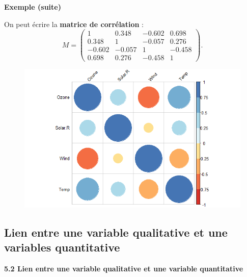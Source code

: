 \documentclass[aspectratio=169,xcolor=dvipsnames]{beamer}
\begin{document}
\begin{frame}
	\begin{exampleblock}{\textbf{Exemple (suite)}}
	\begin{footnotesize}
	On peut écrire la \textbf{matrice de corrélation} :
			\[
			M = \begin{pmatrix}
			1 & 0.348 & -0.602 & 0.698 \\
			0.348 & 1 & -0.057 & 0.276 \\
			-0.602 & -0.057 & 1 & -0.458 \\
			0.698 & 0.276 & -0.458 & 1
			\end{pmatrix}.
			\]
		\begin{figure}
		\centering
		\includegraphics[scale=0.35]{corrplot.png}
		\end{figure}
	\end{footnotesize}
	\end{exampleblock}
\end{frame}

\subsection{Lien entre une variable qualitative et une variables quantitative}

\begin{frame}[plain]

\vfill

\begin{center}
{\huge \textcolor{nyubluedark}{\textbf{5.2 Lien entre une variable qualitative et une variable quantitative}}}
\end{center}

\vfill

\end{frame}
\end{document}
